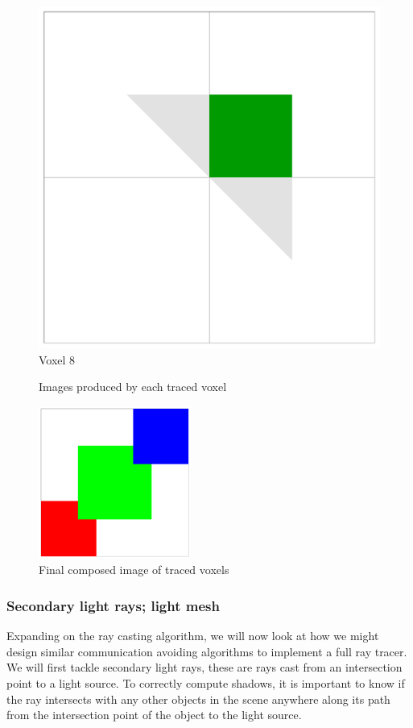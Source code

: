 \begin{figure}[!htb]
  \includegraphics[width=\linewidth]{drawings/cubes_08.pdf}
  Voxel 8
\endminipage
\caption{Images produced by each traced voxel}
\label{fig:cubes}
\end{figure}

\begin{figure}[!htb]
\centering
  \includegraphics[height=5cm]{drawings/cube_final.pdf}
\caption{Final composed image of traced voxels}
\label{fig:cubes_final}
\end{figure}


\subsubsection{Secondary light rays; light mesh}
Expanding on the ray casting algorithm, we will now look at how we might design 
similar communication avoiding algorithms to implement a full ray tracer.  We 
will first tackle secondary light rays, these are rays cast from an intersection
point to a light source.  To correctly compute shadows, it is important to know 
if the ray intersects with any other objects in the scene anywhere along its 
path from the intersection point of the object to the light source.  

